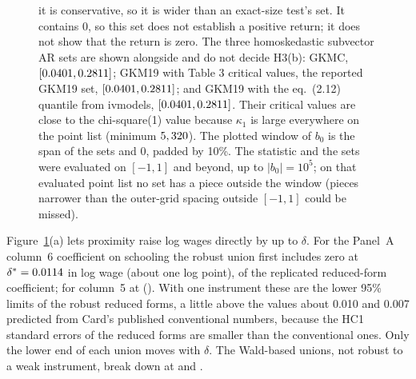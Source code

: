 \documentclass[11pt]{article}
\begin{document}
\begin{figure}[tbp]
{it is conservative, so it is wider than an exact-size test's set. It contains 0, so this
set does not establish a positive return; it does not show that the return is zero. The
three homoskedastic subvector AR sets are shown alongside and do not decide H3(b): GKMC,
$[0.0401, 0.2811]$; GKM19 with Table 3 critical values, the reported GKM19
set, $[0.0401, 0.2811]$; and GKM19 with the eq.~(2.12) quantile
from ivmodels, $[0.0401, 0.2811]$. Their critical values are
close to the chi-square(1) value because $\kappa_1$ is large everywhere on the point list
(minimum $5,320$). The plotted window of $b_0$ is the span of the sets and 0,
padded by 10\%. The statistic and the sets were evaluated on $[-1, 1]$ and beyond, up to
$|b_0| = 10^5$; on that evaluated point list no set has a piece outside the window
(pieces narrower than the outer-grid spacing outside $[-1,1]$ could be missed).}
\label{fig:chr}
\end{figure}

Figure~\ref{fig:chr}(a) lets proximity raise log wages directly by up to $\delta$. For the
Panel~A column~6 coefficient on schooling the robust union first includes zero at
$\delta^* = 0.0114$ in log wage (about one log point), \ASixPacoefChrShare{} of the replicated
reduced-form coefficient; for column~5 at \AFivePacoefChrBreakdown{}
(\AFivePacoefChrShare{}). With one instrument these are the lower 95\% limits of the robust
reduced forms, a little above the values about 0.010 and 0.007 predicted from Card's %
published conventional numbers, because the HC1 standard errors of the reduced forms are
smaller than the conventional ones. Only the lower end of each union moves with $\delta$.
The Wald-based unions, not robust to a weak instrument, break down at
\ASixPacoefChrWaldBreakdown{} and \AFivePacoefChrWaldBreakdown{}.
\end{document}
